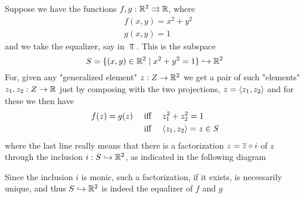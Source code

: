 \documentclass[11pt]{article}
\begin{document}
\begin{examplle}[]
Suppose we have the functions \(f,g:\mathbb{R}^2\rightrightarrows\mathbb{R}\), where
\begin{align*}
&f(x,y)=x^2+y^2\\
&g(x,y)=1
\end{align*}
and we take the equalizer, say in \(\Top\). This is the subspace
\begin{equation*}
S=\{(x,y)\in\mathbb{R}^2\mid x^2+y^2=1\}\hookrightarrow\mathbb{R}^2
\end{equation*}
For, given any "generalized element" \(z:Z\to\mathbb{R}^2\) we get a pair of such
"elements" \(z_1,z_2:Z\to\mathbb{R}\) just by composing with the two projections,
\(z=\langle z_1,z_2\rangle\) and for these we then have
\begin{align*}
f(z)=g(z) &\quad\text{ iff }\quad z_1^2+z_2^2=1\\
&\quad\text{ iff }\quad \langle z_1,z_2\rangle=z\in S
\end{align*}
where the last line really means that there is a factorization
\(z=\overline{z}\circ i\) of \(z\) through the inclusion
\(i:S\hookrightarrow\mathbb{R}^2\), as indicated in the following diagram
\begin{center}\end{center}
Since the inclusion \(i\) is monic, such a factorization, if it exists, is
necessarily unique, and thus \(S\hookrightarrow\mathbb{R}^2\) is indeed the equalizer
of \(f\) and \(g\)
\end{examplle}
\end{document}
